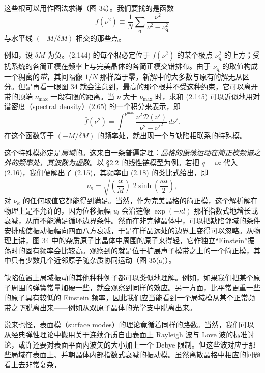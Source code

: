 这些根可以用作图法求得（图 34）。我们要找的是函数
\begin{equation*}
f(\nu^2)\equiv\frac{1}{N}\sum_{\mathbf{q}}\frac{\nu^2}{\nu^2-\nu^2_{\mathbf{q}}}
\tag{2.145}
\end{equation*}
与水平线 $(-M/\delta M)$ 相交的那些点。

例如，设 $\delta M$ 为负。(2.144) 的每个根必定位于 $f(\nu^2)$ 的某个极点 $\nu^2_{\mathbf{q}}$ 的上方；受扰系统的各简正模在频率上与完美晶体的各简正模交错排布。由于 $\nu_{\mathbf{q}}$ 的取值构成一个稠密的\emph{带}，其间隔像 $1/N$ 那样趋于零，新解中的大多数与原有的解无从区分。但是再看一眼图 34 就会注意到，最高的那个根并不受这种约束，它可以离开带的顶端 $\nu_{\max}$ 一段有限的距离。当 $\nu$ 大于 $\nu_{\max}$ 时，求和 (2.145) 可以近似地用对谱密度（spectral density）(2.65) 的一个积分来表示，即
\begin{equation*}
\bar{f}(\nu^2)=\int^{\nu^{\max}}\frac{\nu^2\mathcal{D}(\nu')}{\nu^2-\nu'^2}\,d\nu'.
\tag{2.146}
\end{equation*}
在这个函数等于 $(-M/\delta M)$ 的频率处，就出现一个与缺陷相联系的特殊模。

这个特殊模必定是\emph{局域}的。这来自一条普遍定理：\emph{晶格的振荡运动在简正模频谱之外的频率处，其波数为虚数}。以 §2.2 的线性链模型为例。若把 $q=i\kappa$ 代入 (2.16)，我们便解出了 (2.15)，其频率由 (2.18) 的类比式给出，即
\begin{equation*}
\nu_{\kappa}=\sqrt{\left(\frac{\alpha}{M}\right)}\;2\sinh\left(\frac{\kappa a}{2}\right),
\tag{2.147}
\end{equation*}
对 $\nu_{\kappa}$ 的任何取值它都能得到满足。当然，作为完美晶格的简正模，这个解析解在物理上是不允许的，因为位移振幅 $u_l$ 会沿链像 $\exp(\pm\kappa l)$ 那样指数式地增长或衰减，从而不能满足循环边界条件。然而在非完整晶体中，可以把缺陷邻域的条件安排成使振动振幅向四面八方衰减，于是在样品远处的边界上变得可以忽略。从物理上讲，图 34 中的杂质原子比晶体中周围的原子来得轻，它作独立“Einstein”振荡时的固有频率会比较高。观察到的就是位于扩展声子模带之上的一个简正模，其中只有少数几个近邻原子随杂质协同运动（图 35(a)）。

缺陷位置上局域振动的其他种种例子都可以类似地理解。例如，如果我们把某个原子周围的弹簧常量加硬一些，就会观察到同样的效应。另一方面，比平常更重一些的原子具有较低的 Einstein 频率，因此我们应当能看到一个局域模从某个正常频带之\emph{下}脱离出来——例如从双原子晶体的光学支中脱离出来。

说来也怪，表面模（surface modes）的理论竟循着同样的路数。当然，我们可以从经典弹性理论中搬用关于连续介质自由表面上 Rayleigh 波与 Love 波的标准讨论，或许还要对表面平面内波矢的大小加上一个 Debye 限制。但这些波对应于那些局域在表面上、并朝晶体内部指数式衰减的振动模。虽然离散晶格中相应的问题看上去非常复杂，


